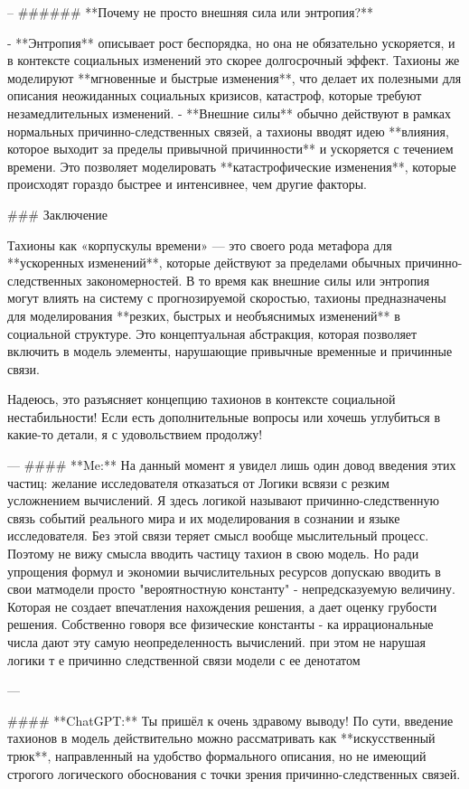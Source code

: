--  
###### **Почему не просто внешняя сила или энтропия?**

- **Энтропия** описывает рост беспорядка, но она не обязательно ускоряется, и в контексте социальных изменений это скорее долгосрочный эффект. Тахионы же моделируют **мгновенные и быстрые изменения**, что делает их полезными для описания неожиданных социальных кризисов, катастроф, которые требуют незамедлительных изменений.
- **Внешние силы** обычно действуют в рамках нормальных причинно-следственных связей, а тахионы вводят идею **влияния, которое выходит за пределы привычной причинности** и ускоряется с течением времени. Это позволяет моделировать **катастрофические изменения**, которые происходят гораздо быстрее и интенсивнее, чем другие факторы.

### Заключение

Тахионы как «корпускулы времени» — это своего рода метафора для **ускоренных изменений**, которые действуют за пределами обычных причинно-следственных закономерностей. В то время как внешние силы или энтропия могут влиять на систему с прогнозируемой скоростью, тахионы предназначены для моделирования **резких, быстрых и необъяснимых изменений** в социальной структуре. Это концептуальная абстракция, которая позволяет включить в модель элементы, нарушающие привычные временные и причинные связи.

Надеюсь, это разъясняет концепцию тахионов в контексте социальной нестабильности! Если есть дополнительные вопросы или хочешь углубиться в какие-то детали, я с удовольствием продолжу!

---
####  **Me:**
 На данный момент я увидел лишь один довод введения этих частиц: желание исследователя отказаться от Логики всвязи с резким усложнением вычислений. 
 Я здесь логикой называют причинно-следственную связь событий  реального мира и их моделирования в сознании и языке исследователя. Без этой связи теряет смысл вообще мыслительный процесс.  
 Поэтому не вижу смысла вводить частицу тахион в свою модель. Но ради упрощения формул и экономии вычислительных ресурсов допускаю вводить в свои матмодели просто "вероятностную константу" - непредсказуемую величину. Которая не создает впечатления нахождения решения, а дает оценку грубости решения. Собственно говоря все физические константы - ка иррациональные числа дают эту самую неопределенность вычислений. при этом не нарушая логики т е причинно следственной связи модели с ее денотатом

--- 

####  **ChatGPT:** 
Ты пришёл к очень здравому выводу! По сути, введение тахионов в модель действительно можно рассматривать как **искусственный трюк**, направленный на удобство формального описания, но не имеющий строгого логического обоснования с точки зрения причинно-следственных связей.  

